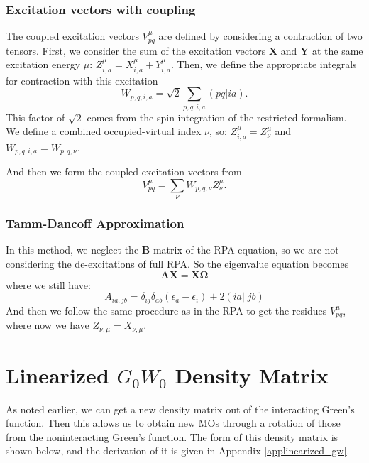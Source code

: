 \documentclass[12pt]{caltech_thesis}
\begin{document}
\subsection{Excitation vectors with coupling}
\label{subsection:coupling}

The coupled excitation vectors $V _{pq}^{\mu }$ are defined 
 by considering a contraction of two tensors. First, we consider the sum of the excitation vectors $\textbf{X}$ and $\textbf{Y}$ at the same excitation energy $\mu$: $Z_{i,a}^{\mu} = X_{i,a}^{\mu} + Y_{i,a}^{\mu}$. Then, we define the appropriate integrals for contraction with this excitation
\begin{equation}
    W_{p,q,i,a} = \sqrt{2} \sum_{p,q,i,a} (pq|ia).
\end{equation}
This factor of $\sqrt{2}$ comes from the spin integration of the restricted formalism.
We define a combined occupied-virtual index $\nu$, so: ${Z}_{i,a}^{\mu} = {Z}_{\nu}^{\mu}$ and ${W}_{p,q,i,a} = {W}_{p,q,\nu}$.

And then we form the coupled excitation vectors from
\begin{equation}
    {V}_{pq}^{\mu} = \sum_{\nu} {W}_{p,q,\nu} {Z}_{\nu}^{\mu}.
\end{equation}

\subsection{Tamm-Dancoff Approximation}
In this method, we neglect the $\textbf{B}$ matrix of the RPA equation, so we are not considering the de-excitations of full RPA. So the eigenvalue equation becomes
\begin{equation}
    \textbf{A}\textbf{X} = \textbf{X} \boldsymbol{\Omega }
\end{equation}
where we still have:
\begin{equation}
    A_{ia,jb} = \delta _{ij}\delta _{ab}(\epsilon_{a}- \epsilon_{i}) + 2(ia||jb)
\label{eq: A matrix TDA}
\end{equation}
And then we follow the same procedure as in the RPA to get the residues $V_{pq}^{\mu}$, where now we have ${Z}_{\nu, \mu} = {X}_{\nu, \mu}$.

\chapter{Linearized $G_0W_0$ Density Matrix}
As noted earlier, we can get a new density matrix out of the interacting Green's function. Then this allows us to obtain new MOs through a rotation of those from the noninteracting Green's function. The form of this density matrix is shown below, and the derivation of it is given in Appendix \ref{applinearized_gw}.
\label{chap:linearized_gw}
\end{document}
